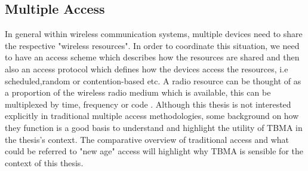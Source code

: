 \documentclass{article}
\begin{document}
\subsection{Multiple Access}
In general within wireless communication systems, multiple devices need to share the respective "wireless resources". In order to coordinate this situation, we need to have an access scheme which describes how the resources are shared and then also an access protocol which defines how the devices access the resources, i.e scheduled,random or contention-based etc. A radio resource can be thought of as a proportion of the wireless radio medium which is available, this can be multiplexed by time, frequency or code \cite{access_tech}. Although this thesis is not interested explicitly in traditional multiple access methodologies, some background on how they function is a good basis to understand and highlight the utility of TBMA in the thesis's context. The comparative overview of traditional access and what could be referred to "new age" access will highlight why TBMA is sensible for the context of this thesis. 
\end{document}
